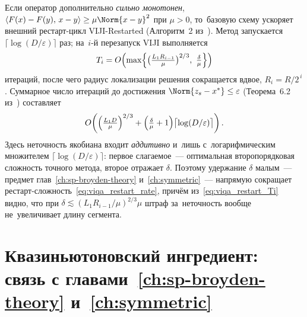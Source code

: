 Если оператор дополнительно \emph{сильно монотонен},
$\langle F(x)-F(y),\,x-y\rangle\ge\mu\Norm{x-y}^2$ при $\mu>0$, то~базовую
схему ускоряет внешний рестарт-цикл VIJI-Restarted (Алгоритм~2
из~\cite{viqa2024}). Метод запускается $\lceil\log(D/\varepsilon)\rceil$
раз; на~$i$-й перезапуск VIJI выполняется
\begin{equation}\label{eq:viqa_restart_Ti}
  T_i = O\!\left(\max\Bigl\{
     \bigl(\tfrac{L_1 R_{i-1}}{\mu}\bigr)^{2/3},\ \tfrac{\delta}{\mu}
     \Bigr\}\right)
\end{equation}
итераций, после чего радиус локализации решения сокращается вдвое,
$R_i = R/2^{\,i}$. Суммарное число итераций до достижения
$\Norm{z_s-x^*}\le\varepsilon$ (Теорема~6.2 из~\cite{viqa2024}) составляет
\begin{equation}\label{eq:viqa_restart_rate}
  O\!\left(\Bigl(\tfrac{L_1 D}{\mu}\Bigr)^{2/3}
           + \Bigl(\tfrac{\delta}{\mu}+1\Bigr)
             \bigl\lceil\log(D/\varepsilon)\bigr\rceil\right).
\end{equation}
Здесь неточность якобиана входит \emph{аддитивно} и~лишь
с~логарифмическим множителем $\lceil\log(D/\varepsilon)\rceil$: первое
слагаемое~--- оптимальная второпорядковая сложность точного метода, второе
отражает $\delta$. Поэтому удержание $\delta$ малым~--- предмет
глав~\ref{ch:sp-broyden-theory} и~\ref{ch:symmetric}~--- напрямую
сокращает рестарт-сложность~\eqref{eq:viqa_restart_rate}, причём
из~\eqref{eq:viqa_restart_Ti} видно, что при $\delta\lesssim
(L_1 R_{i-1}/\mu)^{2/3}\mu$ штраф за~неточность вообще не~увеличивает длину
сегмента.

\section{Квазиньютоновский ингредиент: связь с главами~\ref{ch:sp-broyden-theory} и~\ref{ch:symmetric}}\label{sec:viqa_qn}

